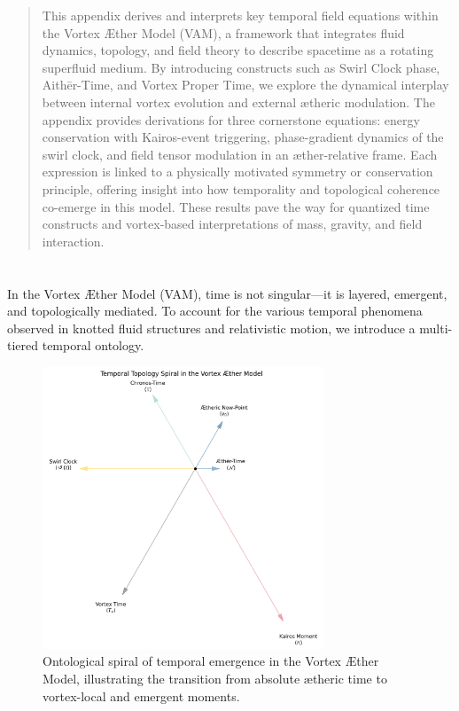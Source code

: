 \documentclass[12pt]{article}
\begin{document}
  \titlepageOpen

  \begin{abstract}

This appendix derives and interprets key temporal field equations within the Vortex Æther Model (VAM), a framework that integrates fluid dynamics, topology, and field theory to describe spacetime as a rotating superfluid medium. By introducing constructs such as Swirl Clock phase, Aithēr-Time, and Vortex Proper Time, we explore the dynamical interplay between internal vortex evolution and external ætheric modulation. The appendix provides derivations for three cornerstone equations: energy conservation with Kairos-event triggering, phase-gradient dynamics of the swirl clock, and field tensor modulation in an æther-relative frame. Each expression is linked to a physically motivated symmetry or conservation principle, offering insight into how temporality and topological coherence co-emerge in this model. These results pave the way for quantized time constructs and vortex-based interpretations of mass, gravity, and field interaction.

  \end{abstract}

  \titlepageClose
\fi

\section{\papertitle}

In the Vortex Æther Model (VAM), time is not singular—it is layered, emergent, and topologically mediated. To account for the various temporal phenomena observed in knotted fluid structures and relativistic motion, we introduce a multi-tiered temporal ontology.

  \begin{figure}[h]
    \centering
    \includegraphics[width=0.75\textwidth]{../images/TimeConstruct}
    \caption{Ontological spiral of temporal emergence in the Vortex Æther Model, illustrating the transition from absolute ætheric time to vortex-local and emergent moments.}
    \label{fig:temporal_swirl}
\end{figure}
\end{document}
